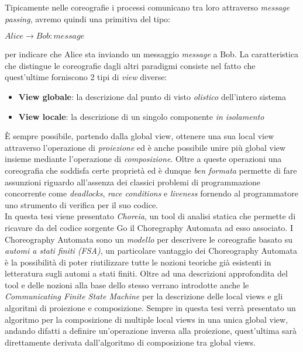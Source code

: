 Tipicamente nelle coreografie i processi comunicano tra loro attraverso \emph{message passing}, avremo quindi una primitiva del tipo:
\begin{center}
    $Alice \rightarrow Bob : message$
\end{center}
per indicare che Alice sta inviando un messaggio \emph{message} a Bob. La caratteristica che distingue le coreografie dagli altri paradigmi consiste nel fatto che quest'ultime forniscono 2 tipi di \emph{view} diverse:
\begin{itemize}
    \item \textbf{View globale}: la descrizione dal punto di visto \emph{olistico} dell'intero sistema
    \item \textbf{View locale}: la descrizione di un singolo componente \emph{in isolamento}
\end{itemize}
È sempre possibile, partendo dalla global view, ottenere una sua local view attraverso l'operazione di \emph{proiezione} ed è anche possibile unire più global view insieme mediante l'operazione di \emph{composizione}\cite{CA_Composition}. Oltre a queste operazioni una coreografia che soddisfa certe proprietà ed è dunque \emph{ben formata} permette di fare assunzioni riguardo all'assenza dei classici problemi di programmazione concorrente come \emph{deadlocks}, \emph{race conditions} e \emph{liveness} fornendo al programmatore uno strumento di verifica per il suo codice.\bigskip \\
In questa tesi viene presentato \emph{Choreia}, un tool di analisi statica che permette di ricavare da del codice sorgente Go il Choregraphy Automata ad esso associato. I Choreography Automata sono un \emph{modello} per descrivere le coreografie basato su \emph{automi a stati finiti (FSA)}, un particolare vantaggio dei Choreography Automata è la possibilità di poter riutilizzare tutte le nozioni teoriche già esistenti in letteratura sugli automi a stati finiti. Oltre ad una descrizioni approfondita del tool e delle nozioni alla base dello stesso verrano introdotte anche le \emph{Communicating Finite State Machine} per la descrizione delle local views e gli algoritmi di proiezione e composizione. Sempre in questa tesi verrà presentato un algoritmo per la composizione di multiple local views in una unica global view, andando difatti a definire un'operazione inversa alla proiezione, quest'ultima sarà direttamente derivata dall'algoritmo di composizione tra global views.
